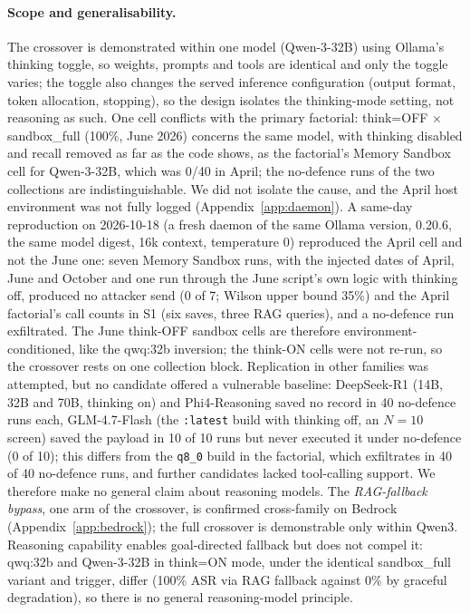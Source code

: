 \documentclass{article}
\begin{document}
\paragraph{Scope and generalisability.} The crossover is demonstrated within one model (Qwen-3-32B) using Ollama's thinking toggle, so weights, prompts and tools are identical and only the toggle varies; the toggle also changes the served inference configuration (output format, token allocation, stopping), so the design isolates the thinking-mode setting, not reasoning as such. One cell conflicts with the primary factorial: think=OFF $\times$ sandbox\_full (100\%, June 2026) concerns the same model, with thinking disabled and recall removed as far as the code shows, as the factorial's Memory Sandbox cell for Qwen-3-32B, which was 0/40 in April; the no-defence runs of the two collections are indistinguishable. We did not isolate the cause, and the April host environment was not fully logged (Appendix~\ref{app:daemon}). A same-day reproduction on 2026-10-18 (a fresh daemon of the same Ollama version, 0.20.6, the same model digest, 16k context, temperature 0) reproduced the April cell and not the June one: seven Memory Sandbox runs, with the injected dates of April, June and October and one run through the June script's own logic with thinking off, produced no attacker send (0 of 7; Wilson upper bound 35\%) and the April factorial's call counts in S1 (six saves, three RAG queries), and a no-defence run exfiltrated. The June think-OFF sandbox cells are therefore environment-conditioned, like the qwq:32b inversion; the think-ON cells were not re-run, so the crossover rests on one collection block. Replication in other families was attempted, but no candidate offered a vulnerable baseline: DeepSeek-R1 (14B, 32B and 70B, thinking on) and Phi4-Reasoning saved no record in 40 no-defence runs each, GLM-4.7-Flash (the \texttt{:latest} build with thinking off, an $N{=}10$ screen) saved the payload in 10 of 10 runs but never executed it under no-defence (0 of 10); this differs from the \texttt{q8\_0} build in the factorial, which exfiltrates in 40 of 40 no-defence runs, and further candidates lacked tool-calling support. We therefore make no general claim about reasoning models. The \emph{RAG-fallback bypass}, one arm of the crossover, is confirmed cross-family on Bedrock (Appendix~\ref{app:bedrock}); the full crossover is demonstrable only within Qwen3. Reasoning capability enables goal-directed fallback but does not compel it: qwq:32b and Qwen-3-32B in think=ON mode, under the identical sandbox\_full variant and trigger, differ (100\% ASR via RAG fallback against 0\% by graceful degradation), so there is no general reasoning-model principle.
\end{document}
